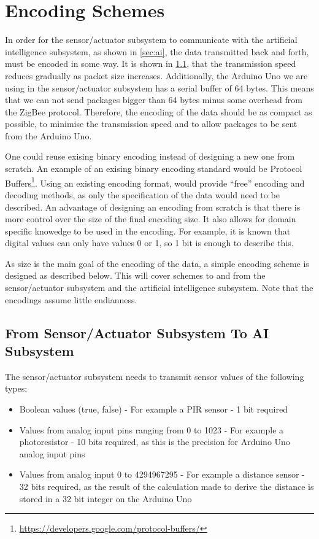 \section{Encoding Schemes}

In order for the sensor/actuator subsystem to communicate with the artificial intelligence subsystem, as shown in \cref{sec:ai}, the data transmitted back and forth, must be encoded in some way. It is shown in \cref{}, that the transmission speed reduces gradually as packet size increases. Additionally, the Arduino Uno we are using in the sensor/actuator subsystem has a serial buffer of 64 bytes. This means that we can not send packages bigger than 64 bytes minus some overhead from the ZigBee protocol. Therefore, the encoding of the data should be as compact as possible, to minimise the transmission speed and to allow packages to be sent from the Arduino Uno.

One could reuse exising binary encoding instead of designing a new one from scratch. An example of an exising binary encoding standard would be Protocol Buffers\footnote{\url{https://developers.google.com/protocol-buffers/}}. Using an existing encoding format, would provide \enquote{free} encoding and decoding methods, as only the specification of the data would need to be described. An advantage of designing an encoding from scratch is that there is more control over the size of the final encoding size. It also allows for domain specific knowedge to be used in the encoding. For example, it is known that digital values can only have values 0 or 1, so 1 bit is enough to describe this.

As size is the main goal of the encoding of the data, a simple encoding scheme is designed as described below. This will cover schemes to and from the sensor/actuator subsystem and the artificial intelligence subsystem. Note that the encodings assume little endianness.

\subsection{From Sensor/Actuator Subsystem To AI Subsystem}
The sensor/actuator subsystem needs to transmit sensor values of the following types:

\begin{itemize}
\item Boolean values (true, false) - For example a PIR sensor - 1 bit required
\item Values from analog input pins ranging from 0 to 1023 - For example a photoresistor - 10 bits required, as this is the precision for Arduino Uno analog input pins
\item Values from analog input 0 to 4294967295 - For example a distance sensor - 32 bits required, as the result of the calculation made to derive the distance is stored in a 32 bit integer on the Arduino Uno
\end{itemize}

